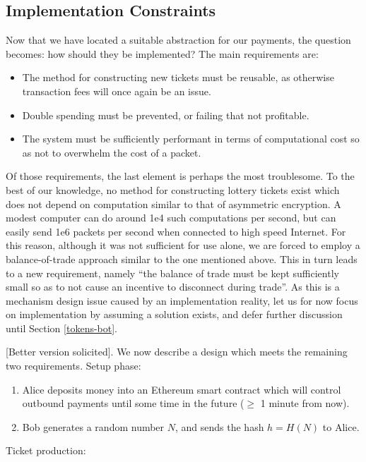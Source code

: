 \documentclass{article}
\begin{document}
\subsection{Implementation Constraints}

Now that we have located a suitable abstraction for our payments, the question becomes: how should they be implemented? The main requirements are:

\begin{itemize}
\item The method for constructing new tickets must be reusable, as otherwise transaction fees will once again be an issue.
\item Double spending must be prevented, or failing that not profitable.
\item The system must be sufficiently performant in terms of computational cost so as not to overwhelm the cost of a packet.
\end{itemize}

Of those requirements, the last element is perhaps the most troublesome. To the best of our knowledge, no method for constructing lottery tickets exist which does not depend on computation similar to that of asymmetric encryption. A modest computer can do around 1e4 such computations per second, but can easily send 1e6 packets per second when connected to high speed Internet. For this reason, although it was not sufficient for use alone, we are forced to employ a balance-of-trade approach similar to the one mentioned above. This in turn leads to a new requirement, namely ``the balance of trade must be kept sufficiently small so as to not cause an incentive to disconnect during trade''. As this is a mechanism design issue caused by an implementation reality, let us for now focus on implementation by assuming a solution exists, and defer further discussion until Section \ref{tokens-bot}.

[Better version solicited]. We now describe a design which meets the remaining two requirements. Setup phase:

\begin{enumerate}
\item Alice deposits money into an Ethereum smart contract which will control outbound payments until some time in the future ($\geq$ 1 minute from now).
\item Bob generates a random number $N$, and sends the hash $h=H(N)$ to Alice.
\end{enumerate}

Ticket production:
\end{document}

